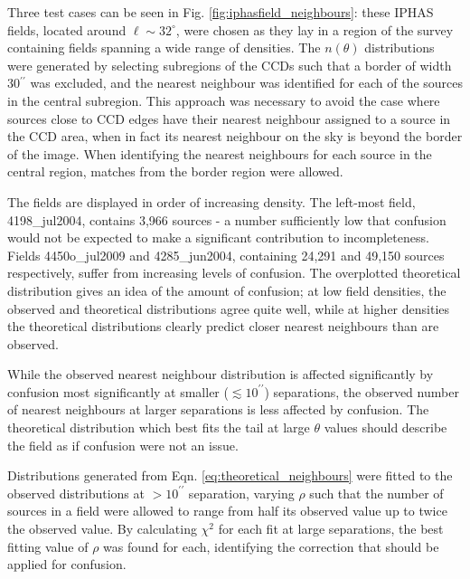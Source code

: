 \documentclass[a4paper,useAMS,usenatbib]{mn2e}
\begin{document}
Three test cases can be seen in Fig. \ref{fig:iphasfield_neighbours}: these
IPHAS fields, located around $\ell\sim32^{\circ}$, were chosen as they lay in a
region of the survey containing fields spanning a wide range of densities. The
$n(\theta)$ distributions were generated by selecting subregions of the CCDs
such that a border of width 30$^{\prime\prime}$ was excluded, and the nearest
neighbour was identified for each of the sources in the central subregion. This
approach was necessary to avoid the case where sources close to CCD edges have
their nearest neighbour assigned to a source in the CCD area, when in fact its
nearest neighbour on the sky is beyond the border of the image. When identifying the nearest neighbours for each source in the central region, matches from the border region were allowed.

The fields are displayed in order of increasing density. The left-most field,
4198\_jul2004, contains 3,966 sources - a number sufficiently low that confusion would not be expected to make a significant contribution to incompleteness. Fields 4450o\_jul2009 and 4285\_jun2004, containing 24,291 and 49,150 sources respectively, suffer from increasing levels of confusion. The overplotted theoretical distribution gives an idea of the amount of confusion; at low field densities, the observed and theoretical distributions agree quite well, while at higher densities the theoretical distributions clearly predict closer nearest neighbours than are observed.

While the observed nearest neighbour distribution is affected significantly by
confusion most significantly at smaller ($\lesssim10^{\prime\prime}$) separations, the observed number of nearest neighbours at larger separations is
less affected by confusion. The theoretical distribution which best fits the
tail at large $\theta$ values should describe the field as if confusion were not an issue.

Distributions generated from Eqn. \ref{eq:theoretical_neighbours} were fitted to the observed distributions at $>10^{\prime\prime}$ separation, varying $\rho$ such that the number of sources in a field were allowed to range from half its observed value up to twice the observed value. By calculating $\chi^2$ for each fit at large separations, the best fitting value of $\rho$ was found for each, identifying the correction that should be applied for confusion.
\end{document}

